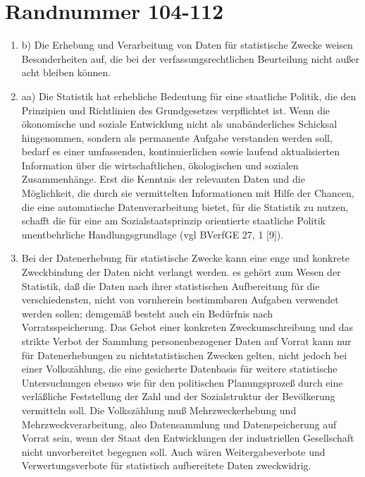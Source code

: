     \section{Randnummer 104-112}
        \begin{enumerate}[label=\arabic*,start=104]
            \item b) Die Erhebung und Verarbeitung von Daten für statistische Zwecke weisen Besonderheiten auf, die bei der verfassungsrechtlichen Beurteilung nicht außer acht bleiben können.
            \item aa) Die Statistik hat erhebliche Bedeutung für eine staatliche Politik, die den Prinzipien und Richtlinien des Grundgesetzes verpflichtet ist. Wenn die ökonomische und soziale Entwicklung nicht als unabänderliches Schicksal hingenommen, sondern als permanente Aufgabe verstanden werden soll, bedarf es einer umfassenden, kontinuierlichen sowie laufend aktualisierten Information über die wirtschaftlichen, ökologischen und sozialen Zusammenhänge. Erst die Kenntnis der relevanten Daten und die Möglichkeit, die durch sie vermittelten Informationen mit Hilfe der Chancen, die eine automatische Datenverarbeitung bietet, für die Statistik zu nutzen, schafft die für eine am Sozialstaatsprinzip orientierte staatliche Politik unentbehrliche Handlungsgrundlage (vgl BVerfGE 27, 1 [9]).
            \item Bei der Datenerhebung für statistische Zwecke kann eine enge und konkrete Zweckbindung der Daten nicht verlangt werden. es gehört zum Wesen der Statistik, daß die Daten nach ihrer statistischen Aufbereitung für die verschiedensten, nicht von vornherein bestimmbaren Aufgaben verwendet werden sollen; demgemäß besteht auch ein Bedürfnis nach Vorratsspeicherung. Das Gebot einer konkreten Zweckumschreibung und das strikte Verbot der Sammlung personenbezogener Daten auf Vorrat kann nur für Datenerhebungen zu nichtstatistischen Zwecken gelten, nicht jedoch bei einer Volkszählung, die eine gesicherte Datenbasis für weitere statistische Untersuchungen ebenso wie für den politischen Planungsprozeß durch eine verläßliche Feststellung der Zahl und der Sozialstruktur der Bevölkerung vermitteln soll. Die Volkszählung muß Mehrzweckerhebung und Mehrzweckverarbeitung, also Datensammlung und Datenspeicherung auf Vorrat sein, wenn der Staat den Entwicklungen der industriellen Gesellschaft nicht unvorbereitet begegnen soll. Auch wären Weitergabeverbote und Verwertungsverbote für statistisch aufbereitete Daten zweckwidrig.

\end{enumerate}
